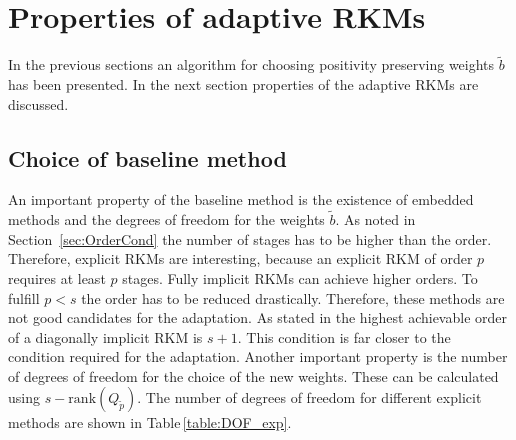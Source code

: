 \documentclass[a4paper]{article}
\numberwithin{equation}{section}
\theoremstyle{plain}
\theoremstyle{definition}
\numberwithin{theorem}{section}
\newcommand{\1}{\mathbbm{1}}
\newcommand{\bt}{\tilde{b}}
\newcommand{\pt}{{\tilde{p}}}
\begin{document}
\section{Properties of adaptive RKMs} \label{sec:integration}

In the previous sections an algorithm for choosing positivity preserving weights $\bt$ has been presented.
In the next section properties of the adaptive RKMs are discussed.

\subsection{Choice of baseline method}
An important property of the baseline method is the existence of embedded methods and the degrees of freedom for the weights $\bt$.
As noted in Section~\ref{sec:OrderCond} the number of stages has to be higher than the order.
Therefore, explicit RKMs are interesting, because an explicit RKM of order $p$ requires at least $p$ stages.
Fully implicit RKMs can achieve higher orders.
To fulfill $p<s$ the order has to be reduced drastically. Therefore, these methods are not good candidates for the adaptation.
As stated in \cite{norsett_attainable_1977} the highest achievable order of a diagonally implicit RKM is $s+1$. This condition is far closer to the condition required for the adaptation.
Another important property is the number of degrees of freedom for the choice of the new weights.
These can be calculated using $s-\mathrm{rank}(Q_{\pt})$. %
The number of degrees of freedom for different explicit methods are shown in Table\,\ref{table:DOF_exp}.
\end{document}
